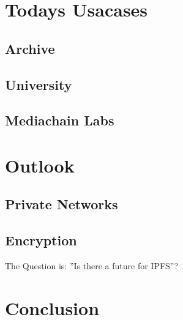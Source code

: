 \documentclass[a4paper,11pt, oneside]{report}
\theoremstyle{definition}
\begin{document}
\chapter{Todays Usacases}
\section{Archive}
\section{University}
\section{Mediachain Labs}


\chapter{Outlook}
\section{Private Networks}
\section{Encryption}

The Question is: ''Is there a future for IPFS''?

\chapter{Conclusion}

\end{document}
